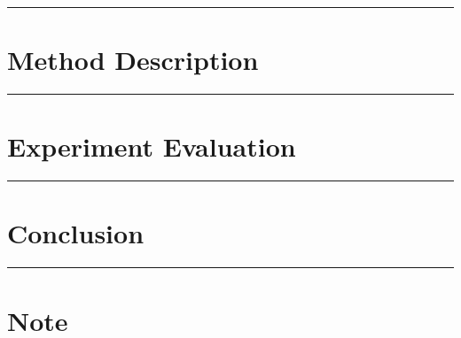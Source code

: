 \documentclass[letterpaper,10pt]{article}
\begin{document}
\begin{center}\rule{\textwidth}{1pt}\end{center}
\section{Method Description}


\begin{center}\rule{\textwidth}{1pt}\end{center}
\section{Experiment Evaluation}


\begin{center}\rule{\textwidth}{1pt}\end{center}
\section{Conclusion}


\begin{center}\rule{\textwidth}{1pt}\end{center}
\section{Note}
\end{document}
